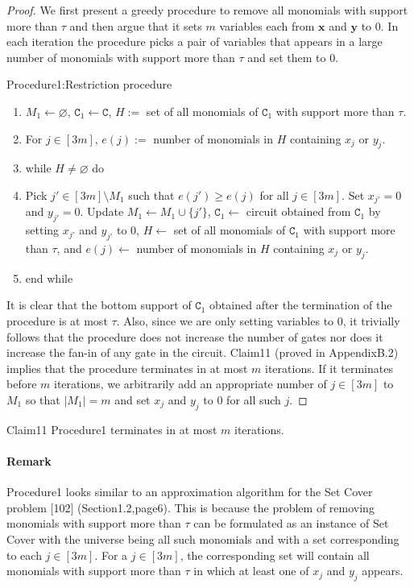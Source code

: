 \begin{proof}
We first present a greedy procedure to remove all monomials with support more than $\tau$ and then argue that it sets $m$ variables each from $\mathbf x$ and $\mathbf y$ to 0. In each iteration the procedure picks a pair of variables that appears in a large number of monomials with support more than $\tau$ and set them to 0.
\begin{authorclaim}{Procedure1:Restriction procedure}
\begin{enumerate}
\item $M_1\leftarrow\varnothing$, $\mathtt C_1\leftarrow\mathtt C$, $H:=$ set of all monomials of $\mathtt C_1$ with support more than $\tau$.
\item For $j\in[3m]$, $e(j):=$ number of monomials in $H$ containing $x_j$ or $y_j$.
\item while $H\ne\varnothing$ do
\item Pick $j'\in[3m]\setminus M_1$ such that $e(j')\ge e(j)$ for all $j\in[3m]$. Set $x_{j'}=0$ and $y_{j'}=0$. Update $M_1\leftarrow M_1\cup\{j'\}$, $\mathtt C_1\leftarrow$ circuit obtained from $\mathtt C_1$ by setting $x_{j'}$ and $y_{j'}$ to 0, $H\leftarrow$ set of all monomials of $\mathtt C_1$ with support more than $\tau$, and $e(j)\leftarrow$ number of monomials in $H$ containing $x_j$ or $y_j$.
\item end while
\end{enumerate}
\end{authorclaim}
It is clear that the bottom support of $\mathtt C_1$ obtained after the termination of the procedure is at most $\tau$. Also, since we are only setting variables to 0, it trivially follows that the procedure does not increase the number of gates nor does it increase the fan-in of any gate in the circuit. Claim11 (proved in AppendixB.2) implies that the procedure terminates in at most $m$ iterations. If it terminates before $m$ iterations, we arbitrarily add an appropriate number of $j\in[3m]$ to $M_1$ so that $|M_1|=m$ and set $x_j$ and $y_j$ to 0 for all such $j$.
\end{proof}
\begin{authorclaim}{Claim11}
Procedure1 terminates in at most $m$ iterations.
\end{authorclaim}
\paragraph{Remark}
Procedure1 looks similar to an approximation algorithm for the Set Cover problem [102] (Section1.2,page6). This is because the problem of removing monomials with support more than $\tau$ can be formulated as an instance of Set Cover with the universe being all such monomials and with a set corresponding to each $j\in[3m]$. For a $j\in[3m]$, the corresponding set will contain all monomials with support more than $\tau$ in which at least one of $x_j$ and $y_j$ appears.
